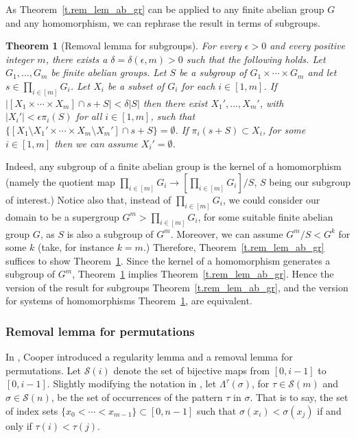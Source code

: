 \documentclass[10pt]{article}
\newtheorem{theorem}{Theorem}
\begin{document}
As Theorem~\ref{t.rem_lem_ab_gr} can be applied to any finite abelian group $G$ and any homomorphism, we can rephrase the result in terms of subgroups.
\begin{theorem}[Removal lemma for subgroups] \label{t.rem_lem_subgroups}
	 For every $\epsilon>0$ and every positive integer $m$, there exists a $\delta=\delta(\epsilon,m)>0$ such that the following holds. Let $G_1,\ldots,G_m$ be finite abelian groups. Let $S$ be a subgroup of $G_1\times \cdots\times G_m$ and let $s\in \prod_{i\in[m]} G_i$.
	Let $X_i$ be a subset of $G_i$ for each $i\in[1,m]$. If
	$|\left[X_1\times\cdots\times X_m\right] \cap s+S|<\delta |S|$ then there exist
	$X_1',\ldots,X_m'$, with $|X_i'|<\epsilon \pi_i (S)$ for all $i\in[1,m]$, such that
	$\{\left[X_1\setminus X_1' \times\cdots\times X_m\setminus X_m'\right] \cap s+S\}=\emptyset$. If $\pi_i (s+S)\subset X_i$, for some $i\in[1,m]$ then we can assume
	$X_i'=\emptyset$.
\end{theorem}
Indeed, any subgroup of a finite abelian group is the kernel of a homomorphism (namely the quotient map $\prod_{i\in[m]} G_i\to \left[\prod_{i\in[m]} G_i\right]/S$, $S$ being our subgroup of interest.) Notice also that, instead of $\prod_{i\in[m]} G_i$, we could consider our domain to be a supergroup $G^m>\prod_{i\in[m]} G_i$, for some suitable finite abelian group $G$, as $S$ is also a subgroup of $G^m$.
Moreover, we can assume $G^m/S<G^k$ for some $k$ (take, for instance $k=m$.) Therefore, Theorem~\ref{t.rem_lem_ab_gr} suffices to show Theorem~\ref{t.rem_lem_subgroups}. Since the kernel of a homomorphism generates
a subgroup of $G^m$, Theorem~\ref{t.rem_lem_subgroups} implies Theorem~\ref{t.rem_lem_ab_gr}. Hence the version of the result for subgroups
Theorem~\ref{t.rem_lem_ab_gr}, and the version for systems of homomorphisms Theorem~\ref{t.rem_lem_subgroups}, are equivalent.


\subsubsection{Removal lemma for permutations} \label{s.intro_permutations}

In \cite{cooper06}, Cooper introduced a regularity lemma and a removal lemma for permutations. Let $\mathcal{S}(i)$ denote the set of bijective maps from $[0,i-1]$ to $[0,i-1]$. Slightly modifying the notation in \cite{cooper06}, let $\Lambda^{\tau}(\sigma)$, for $\tau\in \mathcal{S}(m)$ and $\sigma\in \mathcal{S}(n)$, be the set of occurrences of the pattern $\tau$ in $\sigma$. That is to say, the set of index sets $\{x_0<\cdots < x_{m-1}\}\subset [0,n-1]$
such that $\sigma(x_i)<\sigma(x_j)$ if and only if $\tau(i)<\tau(j)$.
\end{document}
